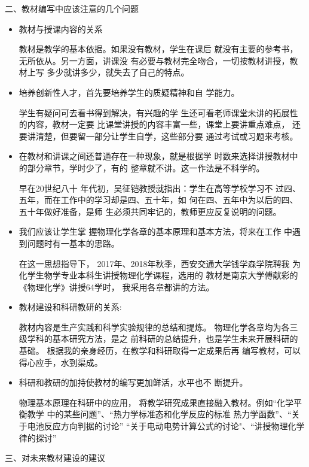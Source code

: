 \documentclass[cn,hazy,blue,12pt,normal]{mynote}
\begin{document}
二、教材编写中应该注意的几个问题
\begin{itemize}
  \item 教材与授课内容的关系
  
  教材是教学的基本依据。如果没有教材，学生在课后
  就没有主要的参考书，无所依从。另一方面，讲课没
  有必要与教材完全吻合，一切按教材讲授，教材上写
  多少就讲多少，就失去了自己的特点。
  \item 培养创新性人才，首先要培养学生的质疑精神和自
  学能力。
  
  学生有疑问可去看书得到解决，有兴趣的学
  生还可看老师课堂未讲的拓展性的内容，教材一定要
  比课堂讲授的内容丰富一些，课堂上要讲重点难点，
  还要讲清楚，但要留一部分让学生自学，这些部分要
  通过考试或习题来考核。

  \item 在教材和讲课之间还普通存在一种现象，就是根据学
  时数来选择讲授教材中的部分章节，学时少了，有的
  整章就不讲。这一作法是不科学的。
  
  早在20世纪八十
  年代初，吴征铠教授就指出：学生在高等学校学习不
  过四、五年，而在工作中的学习却是四、五十年，如
  何在四、五年中为以后的四、五十年做好准备，是师
  生必须共同牢记的，教师更应反复说明的问题。

  \item 我们应该让学生掌
  握物理化学各章的基本原理和基本方法，将来在工作
  中遇到问题时有一基本的思路。
  
  在这一思想指导下，
  2017年、2018年秋季，西安交通大学钱学森学院聘我
  为化学生物学专业本科生讲授物理化学课程，选用的
  教材是南京大学傅献彩的《物理化学》讲授64学时，
  我采用各章都讲的方法。

  \item 教材建设和科研教研的关系:

  教材内容是生产实践和科学实验规律的总结和提炼。
  物理化学各章均为各三级学科的基本研究方法，是之
  前科研的总结提升，也是学生未来开展科研的基础。
  根据我的亲身经历，在教学和科研取得一定成果后再
  编写教材，可以得心应手，水到渠成。

  \item 科研和教研的加持使教材的编写更加鲜活，水平也不
  断提升。
  
  物理基本原理在科研中的应用，
  将教学研究成果直接融入教材。例如“化学平衡教学
  中的某些问题”、“热力学标准态和化学反应的标准
  热力学函数”、“关于电池反应方向判据的讨论”
  “关于电动电势计算公式的讨论"、“讲授物理化学
  律的探讨”
\end{itemize}

三、对未来教材建设的建议
\end{document}
